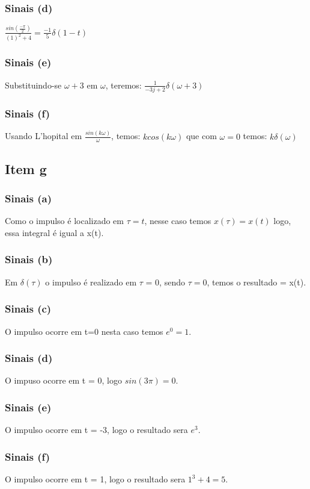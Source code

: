 \documentclass[a4paper, 12pt]{article}
\begin{document}
            \subsubsection{Sinais (d)}
            $\frac{sin(\frac{-\pi}{2})}{(1)^{2}+4} = \frac{-1}{5}\delta(1-t)$
            \subsubsection{Sinais (e)}
            Substituindo-se $\omega + 3$ em $\omega$, teremos: $\frac{1}{-3j + 2}\delta(\omega+3)$
            \subsubsection{Sinais (f)}
            Usando L'hopital em $\frac{sin(k\omega)}{\omega}$, temos: $kcos(k\omega)$ que com $\omega = 0$ temos: $k\delta(\omega)$
        \subsection{Item g}
            \subsubsection{Sinais (a)}
            Como o impulso é localizado em $\tau = t$, nesse caso temos $x(\tau) = x(t)$ logo, essa integral é igual a x(t).
            \subsubsection{Sinais (b)}
            Em $\delta(\tau)$ o impulso é realizado em $\tau$ = 0, sendo $\tau = 0$, temos o resultado = x(t).
            \subsubsection{Sinais (c)}
            O impulso ocorre em t=0 nesta caso temos $e^{0} = 1$.
            \subsubsection{Sinais (d)}
            O impuso ocorre em t = 0, logo $sin(3\pi) = 0$.
            \subsubsection{Sinais (e)}
            O impulso ocorre em t = -3, logo o resultado sera $e^{3}$.
            \subsubsection{Sinais (f)}
            O impulso ocorre em t = 1, logo o resultado sera $1^{3} + 4 = 5$.
\end{document}
